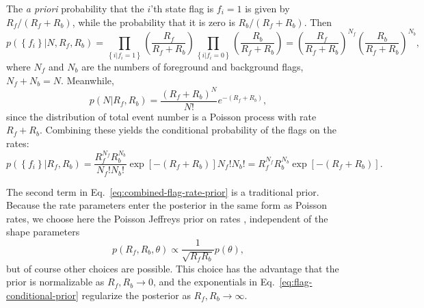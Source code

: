 \documentclass[aps,prd]{revtex4-1}
\newcommand{\mathset}[1]{\left\{ #1 \right\}}
\begin{document}
The {\it a priori} probability that the $i$'th state flag is $f_i=1$ is given by $R_f/(R_f+R_b)$, while the probability that it is zero is $R_b/(R_f+R_b)$.  Then
\begin{equation}
p\left( \mathset{f_i} | N, R_f, R_b\right) = 
\prod_{\mathset{i|f_i=1}} \left(\frac{R_f}{R_f+R_b}\right) 
\prod_{\mathset{i|f_i=0}} \left(\frac{R_b}{R_f+R_b}\right) =
\left(\frac{R_f}{R_f+R_b}\right)^{N_f} \left(\frac{R_b}{R_f+R_b}\right)^{N_b},
\end{equation}
where $N_f$ and $N_b$ are the numbers of foreground and background flags, $N_f+N_b=N$.
Meanwhile,
\begin{equation}
p\left(N |R_f, R_b\right) = \frac{\left(R_f+R_b\right)^N}{N!} e^{-(R_f+R_b)},
\end{equation}
since the distribution of total event number is a Poisson process
with rate $R_f+R_b$.  Combining these yields the conditional probability of the flags on the rates:
\begin{equation}
  \label{eq:flag-conditional-prior}
  p\left(\mathset{f_i} | R_f, R_b\right) = \frac{R_f^{N_f}
    R_b^{N_b}}{N_f! N_b!} \exp\left[ - \left(R_f + R_b\right) \right]
  N_f! N_b! = R_f^{N_f}R_b^{N_b} \exp\left[ - \left(R_f + R_b\right) \right].
\end{equation} 


The second term in Eq.~\eqref{eq:combined-flag-rate-prior} is a
traditional prior.  Because the rate parameters enter the posterior in
the same form as Poisson rates, we choose here the Poisson Jeffreys
prior on rates \citep{Jeffreys1946}, independent of the shape
parameters
\begin{equation}
  p\left( R_f, R_b, \theta\right) \propto \frac{1}{\sqrt{R_f R_b}} p(\theta),
\end{equation}
but of course other choices are possible.  This choice has the
advantage that the prior is normalizable as $R_f, R_b \to 0$, and the
exponentials in Eq.~\eqref{eq:flag-conditional-prior} regularize the
posterior as $R_f, R_b \to \infty$.
\end{document}
